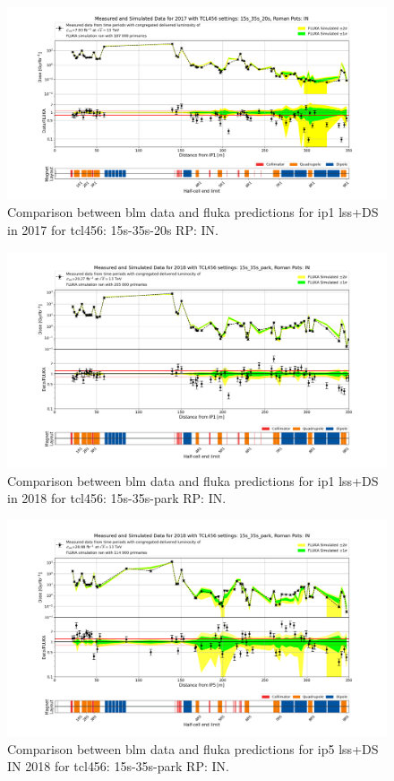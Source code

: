 \documentclass[encoding=utf8,british]{tumphthesis}
\begin{document}
\begin{figure}[H]
    \centering
    \includegraphics[width=0.9\linewidth]{results/benchmarking_2017_afterTS2_30cm_15s_35s_20s.png}
    \caption{Comparison between \acrshort{blm} data and \acrshort{fluka} predictions for \acrshort{ip}1 \acrshort{lss}+DS in 2017 for \acrshort{tcl}456: 15s-35s-20s RP: IN. }
    \label{fig:blm-benchmark-2017}
\end{figure}

\begin{figure}[H]
    \centering
    \includegraphics[width=0.85\linewidth]{results/benchmark_2018_LSS++_15s_35s_park_final.png}
    \caption{Comparison between \acrshort{blm} data and \acrshort{fluka} predictions for \acrshort{ip}1 \acrshort{lss}+DS in 2018 for \acrshort{tcl}456: 15s-35s-park RP: IN. }
    \label{fig:blm-benchmark-2018}
\end{figure}


\begin{figure}[H]
    \centering
    \includegraphics[width=0.85\linewidth]{results/benchmark_BLM_IP5_2018_15s35spark_RPin.png}
    \caption{Comparison between \acrshort{blm} data and \acrshort{fluka} predictions for \acrshort{ip}5 \acrshort{lss}+DS IN 2018 for \acrshort{tcl}456: 15s-35s-park RP: IN. }
    \label{fig:benchmark-blm-ip5-2018}
\end{figure}
\end{document}
